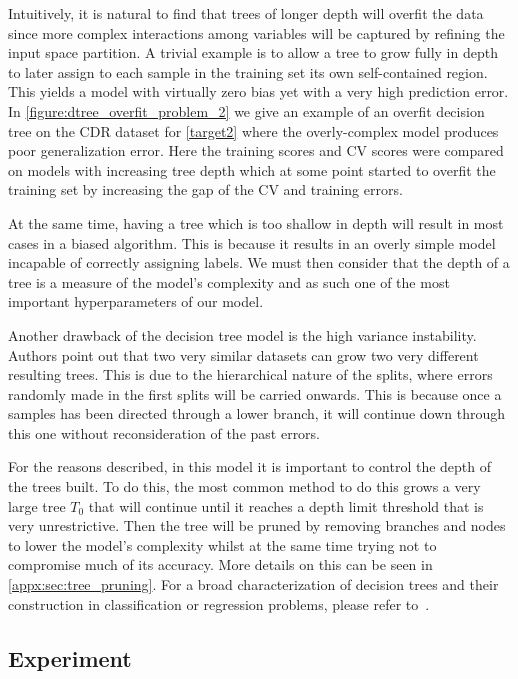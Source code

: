 Intuitively, it is natural to find that trees of longer depth will overfit the data since more complex interactions among variables will be captured by refining the input space partition.
A trivial example is to allow a tree to grow fully in depth to later assign to each sample in the training set its own self-contained region.
This yields a model with virtually zero bias yet with a very high prediction error.
In \cref{figure:dtree_overfit_problem_2} we give an example of an overfit decision tree on the CDR dataset for \cref{target2} where the overly-complex model produces poor generalization error.
Here the training scores and CV scores were compared on models with increasing tree depth which at some point started to overfit the training set by increasing the gap of the CV and training errors.

At the same time, having a tree which is too shallow in depth will result in most cases in a biased algorithm.
This is because it results in an overly simple model incapable of correctly assigning labels.
We must then consider that the depth of a tree is a measure of the model's complexity and as such one of the most important hyperparameters of our model.

Another drawback of the decision tree model is the high variance instability.
Authors point out that two very similar datasets can grow two very different resulting trees.
This is due to the hierarchical nature of the splits, where errors randomly made in the first splits will be carried onwards.
This is because once a samples has been directed through a lower branch, it will continue down through this one without reconsideration of the past errors.

For the reasons described, in this model it is important to control the depth of the trees built.
To do this, the most common method to do this grows a very large tree $T_0$ that will continue until it reaches a depth limit threshold that is very unrestrictive.
Then the tree will be pruned by removing branches and nodes to lower the model's complexity whilst at the same time trying not to compromise much of its accuracy.
More details on this can be seen in \cref{appx:sec:tree_pruning}.
For a broad characterization of decision trees and their construction in classification or regression problems, please refer to~\cite{breiman-cart84}.

\subsection{Experiment}\label{subsection:decision_trees_experiment}

